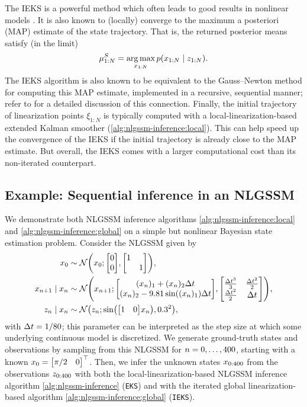 \documentclass{mimosis}
\begin{document}
The IEKS is a powerful method which often leads to good results in nonlinear models \parencite{Särkkä_Svensson_2023}.
It is also known to (locally) converge to the maximum a posteriori (MAP) estimate of the state trajectory.
That is, the returned posterior means satisfy (in the limit)
\begin{equation}
  \label{eq:map-estimate}
  \mean{{1:N}}^S = \argmax_{\st_{1:N}} \p(\st_{1:N} \mid \obs_{1:N}).
\end{equation}
The IEKS algorithm is also known to be equivalent to the Gauss--Newton method for computing this MAP estimate, implemented in a recursive, sequential manner;
refer to \textcite{Bell1994} for a detailed discussion of this connection.
Finally, the initial trajectory of linearization points \(\xi_{1:N}\) is typically computed with a local-linearization-based extended Kalman smoother (\cref{alg:nlgssm-inference:local}).
This can help speed up the convergence of the IEKS if the initial trajectory is already close to the MAP estimate.
But overall, the IEKS comes with a larger computational cost than its non-iterated counterpart.
\subsection{Example: Sequential inference in an NLGSSM}
\label{sec:orga1d0759}
We demonstrate both NLGSSM inference algorithms
\ref{alg:nlgssm-inference:local}
and
\ref{alg:nlgssm-inference:global}
on a simple but nonlinear Bayesian state estimation problem.
Consider the NLGSSM given by
\begin{subequations}
\begin{align}
\st_0 &\sim \N( \st_0; \mqty[0\\0], \mqty[\dmat{ 1, 1}]), \\
\st_{\idxt+1} \mid \st_\idxt &\sim \N(
  \st_{\idxt+1};
  \mqty[(\st_\idxt)_1 + (\st_\idxt)_2 \dt \\ (\st_\idxt)_2 - 9.81 \sin((\st_\idxt)_1) \dt],
  \mqty[\frac{\dt^3}{3} & \frac{\dt^2}{2} \\ \frac{\dt^2}{2^{}} & \dt]
), \\
\obs_\idxt \mid \st_\idxt &\sim \N( \obs_\idxt; \sin(\mqty[1&0] \st_\idxt), 0.3^2),
\end{align}
\end{subequations}
with \({\Delta t} = 1/80\); this parameter can be interpreted as the step size at which some underlying continuous model is discretized.
We generate ground-truth states and observations by sampling from this NLGSSM for \(n = 0, \dots, 400\), starting with a known \(\st_0=\mqty[\pi/2 & 0]^\T\).
Then, we infer the unknown states \(x_{0:400}\) from the observations \(z_{0:400}\) with both the local-linearization-based NLGSSM inference algorithm \ref{alg:nlgssm-inference} (\texttt{EKS})
and with the iterated global linearization-based algorithm \ref{alg:nlgssm-inference:global} (\texttt{IEKS}).
\end{document}
